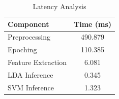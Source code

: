 \begin{table}[htbp]
\caption{Latency Analysis}
\label{tab:latency}
\centering
\begin{tabular}{lc}
\toprule
Component & Time (ms) \\
\midrule
Preprocessing & 490.879 \\
Epoching & 110.385 \\
Feature Extraction & 6.081 \\
LDA Inference & 0.345 \\
SVM Inference & 1.323 \\
\bottomrule
\end{tabular}
\end{table}

